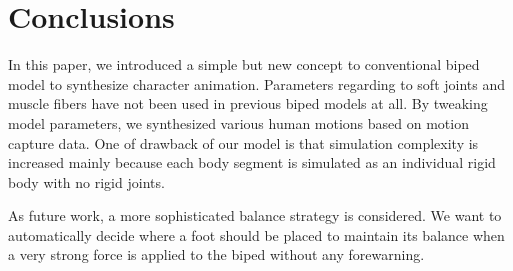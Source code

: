 \documentclass{acm_proc_article-sp}
\begin{document}
\section{Conclusions}
In this paper, we introduced a simple but new concept to
conventional biped model to synthesize character animation.
Parameters regarding to soft joints and muscle fibers have
not been used in previous biped models at all.
By tweaking model parameters, we synthesized various human
motions based on motion capture data. One of drawback of our
model is that simulation complexity is increased
mainly because each body segment is simulated as an individual
rigid body with no rigid joints.

As future work, a more sophisticated balance strategy is
considered. We want to automatically decide
where a foot should be placed to maintain its balance
when a very strong force is applied to the biped
without any forewarning.

%

%
%

\balancecolumns
\end{document}
